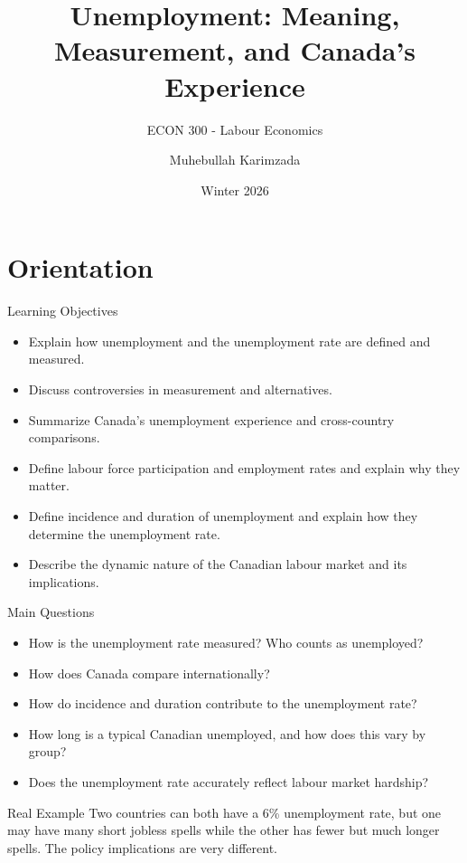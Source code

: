 \documentclass[aspectratio=169]{beamer}
\title{\textbf{Unemployment: Meaning, Measurement, and Canada's Experience}}
\subtitle{{\large ECON 300 - Labour Economics}}
\author{Muhebullah Karimzada}
\date{Winter 2026}
\begin{document}
\begin{frame}[plain]
  \titlepage
\end{frame}

\section{Orientation}

\begin{frame}{Learning Objectives}
\transfade
\begin{itemize}
  \item Explain how unemployment and the unemployment rate are defined and measured.
  \item Discuss controversies in measurement and alternatives.
  \item Summarize Canada's unemployment experience and cross-country comparisons.
  \item Define labour force participation and employment rates and explain why they matter.
  \item Define incidence and duration of unemployment and explain how they determine the unemployment rate.
  \item Describe the dynamic nature of the Canadian labour market and its implications.
\end{itemize}


\end{frame}

\begin{frame}{Main Questions}
\transfade
\begin{itemize}
  \item How is the unemployment rate measured? Who counts as unemployed?
  \item How does Canada compare internationally?
  \item How do incidence and duration contribute to the unemployment rate?
  \item How long is a typical Canadian unemployed, and how does this vary by group?
  \item Does the unemployment rate accurately reflect labour market hardship?
\end{itemize}

\begin{exampleblock}{Real Example}
Two countries can both have a 6\% unemployment rate, but one may have many short jobless spells while the other has fewer but much longer spells. The policy implications are very different.
\end{exampleblock}
\end{frame}
\end{document}
